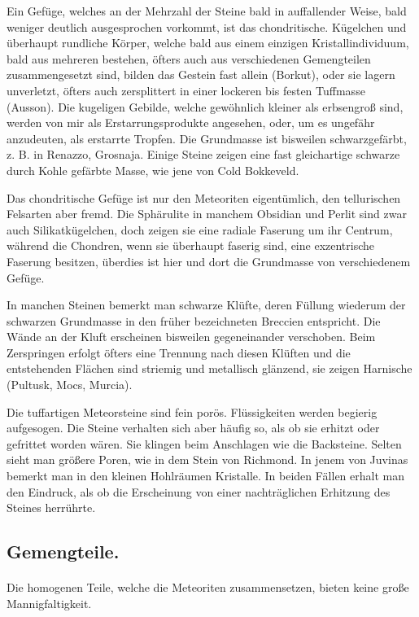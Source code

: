 \documentclass[a4paper, 12pt, oneside]{article}
\begin{document}
Ein Gefüge, welches an der Mehrzahl der Steine bald in auffallender Weise, bald weniger deutlich ausgesprochen vorkommt, ist das chondritische. Kügelchen und überhaupt rundliche Körper, welche bald aus einem einzigen Kristallindividuum, bald aus mehreren bestehen, öfters auch aus verschiedenen Gemengteilen zusammengesetzt sind, bilden das Gestein fast allein (Borkut), oder sie lagern unverletzt, öfters auch zersplittert in einer lockeren bis festen Tuffmasse (Ausson). Die kugeligen Gebilde, welche gewöhnlich kleiner als erbsengroß sind, werden von mir als Erstarrungsprodukte angesehen, oder, um es ungefähr anzudeuten, als erstarrte Tropfen. Die Grundmasse ist bisweilen schwarzgefärbt, z. B. in Renazzo, Grosnaja. Einige Steine zeigen eine fast gleichartige schwarze durch Kohle gefärbte Masse, wie jene von Cold Bokkeveld.

Das chondritische Gefüge ist nur den Meteoriten eigentümlich, den tellurischen Felsarten aber fremd. Die Sphärulite in manchem Obsidian und Perlit sind zwar auch Silikatkügelchen, doch zeigen sie eine radiale Faserung um ihr Centrum, während die Chondren, wenn sie überhaupt faserig sind, eine exzentrische Faserung besitzen, überdies ist hier und dort die Grundmasse von verschiedenem Gefüge.

In manchen Steinen bemerkt man schwarze Klüfte, deren Füllung wiederum der schwarzen Grundmasse in den früher bezeichneten Breccien entspricht. Die Wände an der Kluft erscheinen bisweilen gegeneinander verschoben. Beim Zerspringen erfolgt öfters eine Trennung nach diesen Klüften und die entstehenden Flächen sind striemig und metallisch glänzend, sie zeigen Harnische (Pultusk, Mocs, Murcia).

Die tuffartigen Meteorsteine sind fein porös. Flüssigkeiten werden begierig aufgesogen. Die Steine verhalten sich aber häufig so, als ob sie erhitzt oder gefrittet worden wären. Sie klingen beim Anschlagen wie die Backsteine. Selten sieht man größere Poren, wie in dem Stein von Richmond. In jenem von Juvinas bemerkt man in den kleinen Hohlräumen Kristalle. In beiden Fällen erhalt man den Eindruck, als ob die Erscheinung von einer nachträglichen Erhitzung des Steines herrührte.

\subsection{Gemengteile.}
\paragraph*{}
Die homogenen Teile, welche die Meteoriten zusammensetzen, bieten keine große Mannigfaltigkeit.
\end{document}
